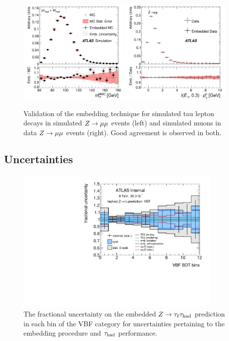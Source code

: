 \begin{figure}[tp]
  \centering
  \includegraphics[width=0.48\textwidth]{figures/HIGG-2013-32/fig_03b}
  \includegraphics[width=0.48\textwidth]{figures/HIGG-2013-32/fig_03a}
  \caption{Validation of the embedding technique for simulated tau lepton decays in simulated $Z \rightarrow \mu\mu$ events (left) and simulated muons in data $Z \rightarrow \mu\mu$ events (right). Good agreement is observed in both.}
  \label{fig:backgrounds-embedding-validation}
\end{figure}

\clearpage

\subsection{Uncertainties}

\begin{figure}[tp]
  \includegraphics[width=0.90\textwidth]{figures/uncertainties/uncertainties_lephad_paper14_8TeV_Ztautau_VBF}
  \caption{The fractional uncertainty on the embedded $Z\rightarrow\tau_\ell\tau_\text{had}$ prediction in each bin of the VBF category for uncertainties pertaining to the embedding procedure and $\tau_\text{had}$ performance.}
  \label{fig:backgrounds-uncertainties-Ztautau}
\end{figure}

